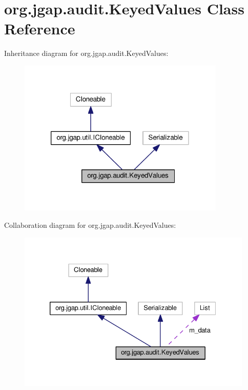 \hypertarget{classorg_1_1jgap_1_1audit_1_1_keyed_values}{\section{org.\-jgap.\-audit.\-Keyed\-Values Class Reference}
\label{classorg_1_1jgap_1_1audit_1_1_keyed_values}
}


Inheritance diagram for org.\-jgap.\-audit.\-Keyed\-Values\-:
\nopagebreak
\begin{figure}[H]
\begin{center}
\leavevmode
\includegraphics[width=280pt]{classorg_1_1jgap_1_1audit_1_1_keyed_values__inherit__graph}
\end{center}
\end{figure}


Collaboration diagram for org.\-jgap.\-audit.\-Keyed\-Values\-:
\nopagebreak
\begin{figure}[H]
\begin{center}
\leavevmode
\includegraphics[width=331pt]{classorg_1_1jgap_1_1audit_1_1_keyed_values__coll__graph}
\end{center}
\end{figure}
